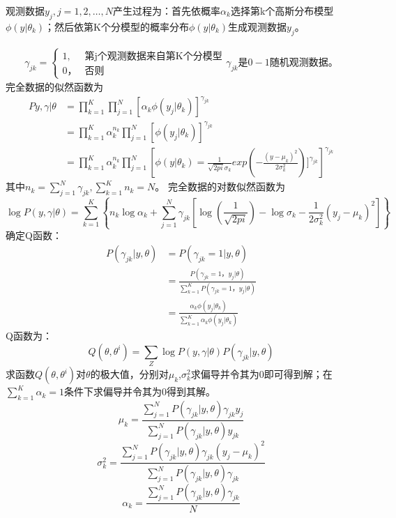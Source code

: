 \documentclass{article}
\begin{document}
	观测数据$y_{j},j=1,2,\ldots,N$产生过程为：首先依概率$\alpha _{k}$选择第k个高斯分布模型$\phi \left ( y|\theta _{k} \right )$；然后依第K个分模型的概率分布$\phi \left ( y|\theta _{k} \right )$生成观测数据$y_{j}$。
	
	\begin{align*}
	\gamma _{jk}=\begin{cases}
	1 , & \text{第j个观测数据来自第K个分模型} \\
	0 ，& \text{否则}
	\end{cases}
	\gamma _{jk}是0-1随机观测数据。
	\end{align*}
	完全数据的似然函数为
	\begin{align*}
	P{y,\gamma |\theta } &= \prod_{k=1}^{K}\prod_{j=1}^{N}\left [ \alpha _{k}\phi \left ( y_{j}|\theta _{k} \right ) \right ]^{\gamma _{jk}} \\
	&= \prod_{k=1}^{K}\alpha _{k}^{n_{k}}\prod_{j=1}^{N}\left [ \phi \left ( y_{j}|\theta _{k} \right ) \right ]^{\gamma _{jk}}\\
	&=   \prod_{k=1}^{K}\alpha _{k}^{n_{k}}\prod_{j=1}^{N}\left [ \phi \left ( y|\theta _{k} \right )=\frac{1}{\sqrt{2pi}\sigma _{k}}exp\left ( -\frac{(y-\mu _{k})^{2}}{2\sigma _{k}^{2}} \right )]^{\gamma _{jk}}\right ]^{\gamma _{jk}}
	\end{align*}
	其中$n_{k}=\sum_{j=1}^{N}\gamma _{jk},\sum_{k=1}^{K}n_{k}=N$。
	完全数据的对数似然函数为
	\begin{equation*}
	\log P\left ( y,\gamma|\theta   \right )=\sum_{k=1}^{K}\left \{ n_{k}\log \alpha _{k}+\sum_{j=1}^{N}\gamma _{jk}\left [ \log \left ( \frac{1}{\sqrt{2pi}} \right )-\log \sigma _{k}-\frac{1}{2\sigma _{k}^{2}}\left ( y_{j}-\mu _{k} \right )^{2} \right ] \right \}
	\end{equation*}
	确定Q函数：
	\begin{align*}
	P\left ( \gamma _{jk}|y,\theta  \right ) &= 	P\left ( \gamma _{jk}=1|y,\theta  \right )  \\
	&= \frac{P\left ( \gamma _{jk}=1，y_{j}|\theta  \right )}{\sum_{k=1}^{K}P\left ( \gamma _{jk}=1，y_{j}|\theta  \right )}\\
	&= \frac{\alpha _{k}\phi \left ( y_{j}|\theta _{k} \right )}{\sum_{k=1}^{K}\alpha _{k}\phi \left ( y_{j}|\theta _{k} \right )} 
	\end{align*}
	Q函数为：$$Q\left ( \theta ,\theta ^{i} \right )=\sum _{Z}\log P\left (  y,\gamma|\theta  \right )P\left ( \gamma _{jk}|y,\theta \right )$$
	求函数$Q\left ( \theta ,\theta ^{i} \right )$对$\theta$的极大值，分别对$\mu _{k}$,$\sigma _{k}^{2}$求偏导并令其为0即可得到解；在$\sum_{k=1}^{K}\alpha _{k}=1$条件下求偏导并令其为0得到其解。
	$$\mu _{k}=\frac{\sum_{j=1}^{N}	P\left ( \gamma _{jk}|y,\theta  \right )\gamma _{jk}y_{j}}{\sum_{j=1}^{N}	P\left ( \gamma _{jk}|y,\theta  \right )y_{jk}}$$
	$$\sigma ^{2}_{k}=\frac{\sum_{j=1}^{N}	P\left ( \gamma _{jk}|y,\theta  \right )\gamma _{jk}\left ( y_{j}-\mu _{k} \right )^{2}}{\sum_{j=1}^{N}	P\left ( \gamma _{jk}|y,\theta  \right )\gamma _{jk}}$$
	$$\alpha_{k}=\frac{\sum_{j=1}^{N}P\left ( \gamma _{jk}|y,\theta  \right )\gamma _{jk}}{N}$$
	
\end{document}
